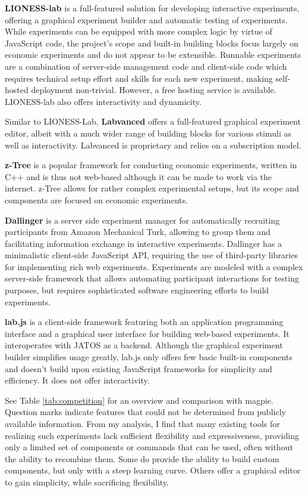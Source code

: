 \documentclass[a4paper,11pt]{scrreprt}
\begin{document}
\textbf{LIONESS-lab} \citep{Giamattei2020} is a full-featured solution for developing interactive experiments, offering a graphical experiment builder and automatic testing of experiments. While experiments can be equipped with more complex logic by virtue of JavaScript code, the project's scope and built-in building blocks focus largely on economic experiments and do not appear to be extensible. Runnable experiments are a combination of server-side management code and client-side code which requires technical setup effort and skills for each new experiment, making self-hosted deployment non-trivial. However, a free hosting service is available. LIONESS-lab also offers interactivity and dynamicity.

Similar to LIONESS-Lab, \textbf{Labvanced} \citep{Scicovery2018} offers a full-featured graphical experiment editor, albeit with a much wider range of building blocks for various stimuli as well as interactivity. Labvanced is proprietary and relies on a subscription model.

\textbf{z-Tree} \citep{Fischbacher2010} is a popular framework for conducting economic experiments, written in C++ and is thus not web-based although it can be made to work via the internet. z-Tree allows for rather complex experimental setups, but its scope and components are focused on economic experiments.

\textbf{Dallinger} \citep{Suchow2016} is a server side experiment manager for automatically recruiting participants from Amazon Mechanical Turk, allowing to group them and facilitating information exchange in interactive experiments. Dallinger has a minimalistic client-side JavaScript API, requiring the use of third-party libraries for implementing rich web experiments. Experiments are modeled with a complex server-side framework that allows automating participant interactions for testing purposes, but requires sophisticated software engineering efforts to build experiments.

\textbf{lab.js} \citep{Henninger2020} is a client-side framework featuring both an application programming interface and a graphical user interface  for building web-based experiments. It interoperates with JATOS \citep{Lange2015} as a backend. Although the graphical experiment builder simplifies usage greatly, lab.js only offers few basic built-in components and doesn't build upon existing JavaScript frameworks for simplicity and efficiency. It does not offer interactivity.

See Table \ref{tab:competition} for an overview and comparison with magpie. Question marks indicate features that could not be determined from publicly available information. From my analysis, I find that many existing tools for realizing such experiments lack sufficient flexibility and expressiveness, providing only a limited set of components or commands that can be used, often without the ability to recombine them. Some do provide the ability to build custom components, but only with a steep learning curve. Others offer a graphical editor to gain simplicity, while sacrificing flexibility.
\end{document}
